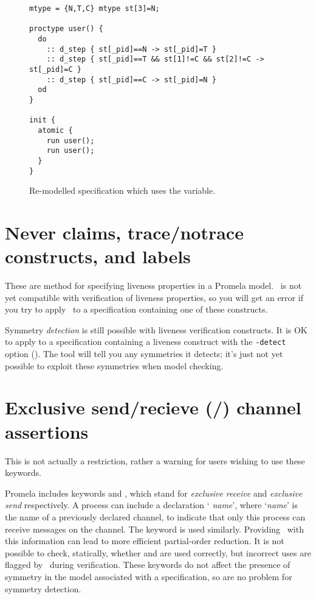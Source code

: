 \begin{figure}
\begin{scriptsize}
\begin{verbatim}
mtype = {N,T,C} mtype st[3]=N;

proctype user() {
  do
    :: d_step { st[_pid]==N -> st[_pid]=T }
    :: d_step { st[_pid]==T && st[1]!=C && st[2]!=C -> st[_pid]=C }
    :: d_step { st[_pid]==C -> st[_pid]=N }
  od
}

init {
  atomic {
    run user();
    run user();
  }
}
\end{verbatim}
\end{scriptsize}
\caption{Re-modelled specification which uses the \protect{}
variable.}\label{fig:limitations:remodelledpid}
\end{figure}

\section{Never claims, trace/notrace constructs, \protect{} and \protect{} labels}

These are method for specifying liveness properties in a Promela model.  \topspin\ is not
yet compatible with verification of liveness properties, so you will get an error if you try
to apply \topspin\ to a specification containing one of these constructs.

Symmetry \emph{detection} is still possible with liveness verification constructs.  It is OK
to apply \topspin to a specification containing a liveness construct with the \texttt{-detect}
option ().  The tool will tell you any symmetries it detects; it's just not yet
possible to exploit these symmetries when model checking.

\section{Exclusive send/recieve (\protect{}/\protect{}) channel assertions}

This is not actually a restriction, rather a warning for users wishing to use these keywords.

Promela includes keywords
 and ,
which stand for {\it exclusive receive} and {\it exclusive send}
respectively. A process can include a declaration `
\emph{name}', where `\emph{name}' is the name of a previously declared
channel, to indicate that only this process can receive messages on
the channel. The  keyword is used similarly.  Providing
\spin\ with this information can lead to more efficient
partial-order reduction. It is not
possible to check, statically, whether  and 
are used correctly, but incorrect uses are flagged by \spin\ during
verification.  These keywords do not affect the presence of symmetry
in the model associated with a specification, so are no problem for
symmetry detection.

